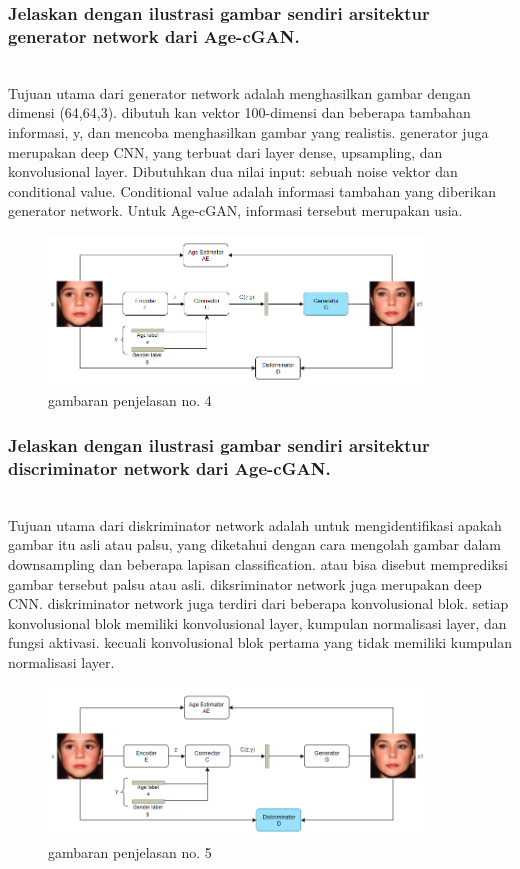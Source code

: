 \subsubsection{Jelaskan dengan ilustrasi gambar sendiri arsitektur generator network dari Age-cGAN.}
\hfill\\
Tujuan utama dari generator network adalah menghasilkan gambar dengan dimensi (64,64,3). dibutuh kan vektor 100-dimensi dan beberapa tambahan informasi, y, dan mencoba menghasilkan gambar yang realistis. generator juga merupakan deep CNN, yang terbuat dari layer dense, upsampling, dan konvolusional layer. Dibutuhkan dua nilai input: sebuah noise vektor dan conditional value. Conditional value adalah informasi tambahan yang diberikan generator network. Untuk Age-cGAN, informasi tersebut merupakan usia.

\begin{figure}[H]
	\centering
	\includegraphics[width=10cm]{figures/1174083/figures9/4.png}
	\caption{gambaran penjelasan no. 4}
\end{figure}

\subsubsection{Jelaskan dengan ilustrasi gambar sendiri arsitektur discriminator network dari Age-cGAN.}
\hfill\\
Tujuan utama dari diskriminator network adalah untuk mengidentifikasi apakah gambar itu asli atau palsu, yang diketahui dengan cara mengolah gambar dalam downsampling dan beberapa lapisan classification. atau bisa disebut memprediksi gambar tersebut palsu atau asli. diksriminator network juga merupakan deep CNN. diskriminator network juga terdiri dari beberapa konvolusional blok. setiap konvolusional blok memiliki konvolusional layer, kumpulan normalisasi layer, dan fungsi aktivasi. kecuali konvolusional blok pertama yang tidak memiliki kumpulan normalisasi layer.

\begin{figure}[H]
	\centering
	\includegraphics[width=10cm]{figures/1174083/figures9/5.png}
	\caption{gambaran penjelasan no. 5}
\end{figure}


